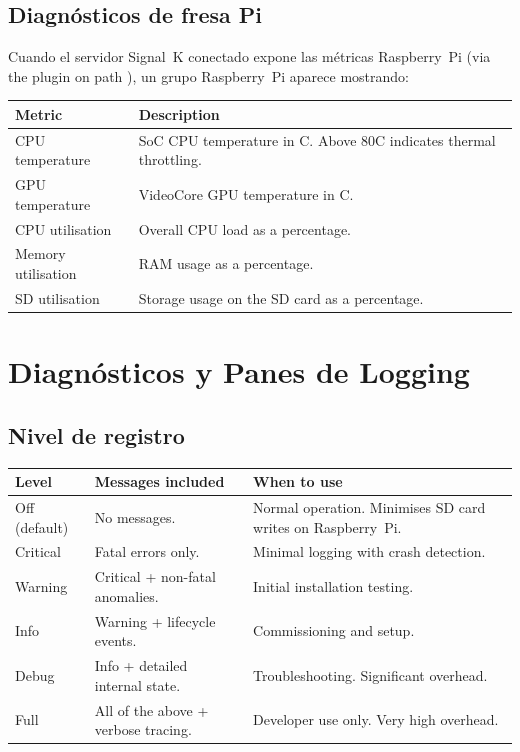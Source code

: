 \subsection{Diagnósticos de fresa Pi}

Cuando el servidor Signal~K conectado expone las métricas Raspberry~Pi
(via the  plugin on path ),
un grupo Raspberry~Pi aparece mostrando:

\begin{longtable}{L{3.6cm}L{10.1cm}}
\toprule
{}
\color{white}\sffamily\bfseries Metric &
\color{white}\sffamily\bfseries Description \\
\midrule
CPU temperature   & SoC CPU temperature in \textdegree{}C. Above 80\textdegree{}C indicates thermal throttling. \\
GPU temperature   & VideoCore GPU temperature in \textdegree{}C. \\
CPU utilisation   & Overall CPU load as a percentage. \\
Memory utilisation& RAM usage as a percentage. \\
SD utilisation    & Storage usage on the SD card as a percentage. \\
\bottomrule
\end{longtable}

\section{Diagnósticos y Panes de Logging}


\subsection{Nivel de registro}

\begin{longtable}{L{2.4cm}L{4.6cm}L{6.7cm}}
\toprule
{}
\color{white}\sffamily\bfseries Level &
\color{white}\sffamily\bfseries Messages included &
\color{white}\sffamily\bfseries When to use \\
\midrule
Off (default) & No messages. & Normal operation. Minimises SD card writes on Raspberry~Pi. \\
Critical      & Fatal errors only. & Minimal logging with crash detection. \\
Warning       & Critical + non-fatal anomalies. & Initial installation testing. \\
Info          & Warning + lifecycle events. & Commissioning and setup. \\
Debug         & Info + detailed internal state. & Troubleshooting. Significant overhead. \\
Full          & All of the above + verbose tracing. & Developer use only. Very high overhead. \\
\bottomrule
\end{longtable}

